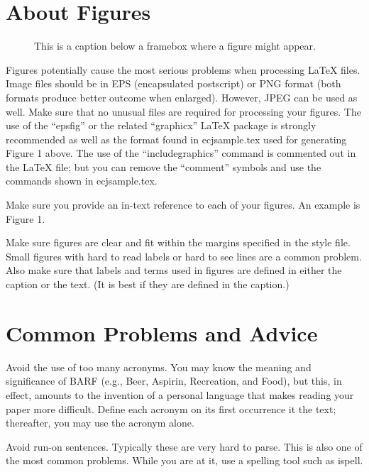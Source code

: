 \documentclass[twoside]{article}
\begin{document}
\section{About Figures}

\newcommand{\fig}[2]{
	\begin{figure}[t]{
		\centering{
			\texttt{[image: \#1]}
		}
		\caption{#2}
	}
	\end{figure}
}

\fig{FNR Ratio|German.png}{This is a caption below a framebox where a figure might appear.}

Figures potentially cause the most serious problems when processing \LaTeX{}
files. Image files should be in EPS (encapsulated postscript) or 
PNG format (both formats produce better outcome when enlarged). However, JPEG 
can be used as well. Make sure that no unusual files are required for 
processing your figures.
The use of the ``epsfig'' or the related ``graphicx'' \LaTeX{} package is 
strongly recommended as well as the
format found in ecjsample.tex used for generating Figure 1 above.
The use of the ``includegraphics'' command is commented out in the \LaTeX{} 
file;
but you can remove the ``comment'' symbols and use the
commands shown in ecjsample.tex.

Make sure you provide an in-text reference to each of your figures.  An 
example is Figure 1.

Make sure figures are clear and fit within the margins specified in the 
style file.  Small figures with hard to read labels or hard to see lines are 
a common problem.  Also make sure that labels and terms used in figures are
defined in either the caption or the text. (It is best if they
are defined in the caption.)

\section{Common Problems and Advice}

Avoid the use of too many acronyms. You may know the meaning and 
significance of BARF (e.g., Beer, Aspirin, Recreation, and Food), but this, 
in effect, amounts to the invention of a personal language that makes 
reading your paper more difficult.  Define each acronym on its first 
occurrence it the text; thereafter, you may use the acronym alone.

Avoid run-on sentences.  Typically these are very hard to parse. This is 
also one of the most common problems. While you are at it, use a spelling 
tool such as ispell.
\end{document}
